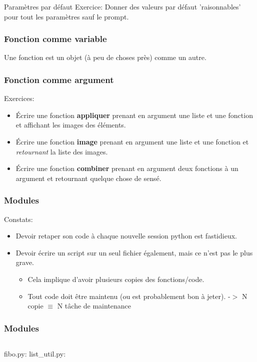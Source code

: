 \documentclass{beamer}
\begin{document}
\begin{frame}{Paramètres par défaut}
  Exercice: Donner des valeurs par défaut 'raisonnables' pour tout les paramètres sauf le prompt.
\end{frame}

\begin{frame}[fragile]\frametitle{Fonction comme variable}
  Une fonction est un objet (à peu de choses près) comme un autre.
  \fbox{}
\end{frame}

\begin{frame}[fragile]\frametitle{Fonction comme argument}
  Exercices:
  \begin{itemize}
  \item Écrire une fonction {\bf appliquer} prenant en argument une liste et une fonction et affichant les images des éléments.
  \item Écrire une fonction {\bf image} prenant en argument une liste et une fonction et {\em retournant} la liste des images.
  \item Écrire une fonction {\bf combiner} prenant en argument deux fonctions à un argument et retournant quelque chose de sensé.
  \end{itemize}
\end{frame}

\begin{frame}[fragile]\frametitle{Modules}
  Constats:
  \begin{itemize}
  \item Devoir retaper son code à chaque nouvelle session python est fastidieux.
  \item Devoir écrire un script sur un seul fichier également, mais ce n'est pas le plus grave.
    \begin{itemize}
    \item Cela implique d'avoir plusieurs copies des fonctions/code.
    \item Tout code doit être maintenu (ou est probablement bon à jeter). \linebreak
      -$>$ N copie $\equiv$ N tâche de maintenance
    \end{itemize}
  \end{itemize}
\end{frame}

\begin{frame}[fragile]\frametitle{Modules}
  \begin{columns}
    fibo.py:
    \newline
    \fbox{}
    list\_util.py:
    \newline
    \fbox{}
  \end{columns}
  \fbox{}
\end{frame}
\end{document}
